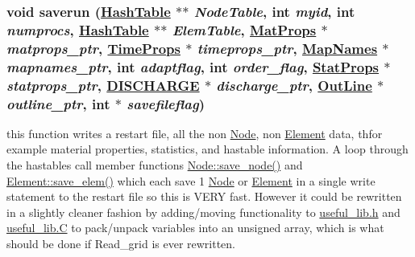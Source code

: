 \hypertarget{restart_8C_a2}{
\subsubsection[saverun]{\setlength{\rightskip}{0pt plus 5cm}void saverun (\hyperlink{classHashTable}{Hash\-Table} $\ast$$\ast$ {\em Node\-Table}, int {\em myid}, int {\em numprocs}, \hyperlink{classHashTable}{Hash\-Table} $\ast$$\ast$ {\em Elem\-Table}, \hyperlink{structMatProps}{Mat\-Props} $\ast$ {\em matprops\_\-ptr}, \hyperlink{structTimeProps}{Time\-Props} $\ast$ {\em timeprops\_\-ptr}, \hyperlink{structMapNames}{Map\-Names} $\ast$ {\em mapnames\_\-ptr}, int {\em adaptflag}, int {\em order\_\-flag}, \hyperlink{structStatProps}{Stat\-Props} $\ast$ {\em statprops\_\-ptr}, \hyperlink{structDISCHARGE}{DISCHARGE} $\ast$ {\em discharge\_\-ptr}, \hyperlink{structOutLine}{Out\-Line} $\ast$ {\em outline\_\-ptr}, int $\ast$ {\em savefileflag})}}
\label{restart_8C_a2}


this function writes a restart file, all the non \hyperlink{classNode}{Node}, non \hyperlink{classElement}{Element} data, thfor example material properties, statistics, and hastable information. A loop through the hastables call member functions \hyperlink{classNode_a6}{Node::save\_\-node()} and \hyperlink{classElement_a6}{Element::save\_\-elem()} which each save 1 \hyperlink{classNode}{Node} or \hyperlink{classElement}{Element} in a single write statement to the restart file so this is VERY fast. However it could be rewritten in a slightly cleaner fashion by adding/moving functionality to \hyperlink{useful__lib_8h}{useful\_\-lib.h} and \hyperlink{constant_8h_a21}{useful\_\-lib.C} to pack/unpack variables into an unsigned array, which is what should be done if Read\_\-grid is ever rewritten. 

